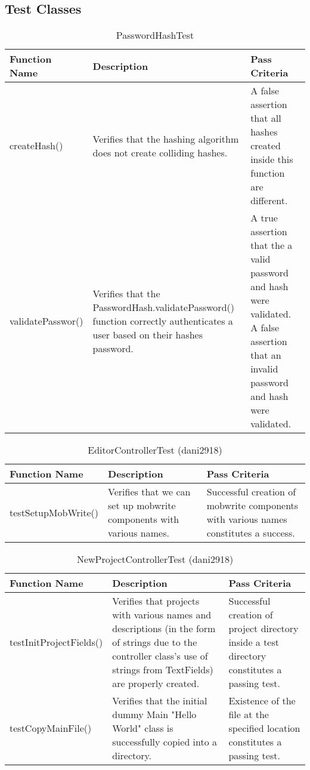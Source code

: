 \documentclass[14pt, a4paper]{article}
\begin{document}
\subsection{Test Classes}

\begin{table}[h]
	\centering	
	\caption{PasswordHashTest}
	\begin{tabular}{|p{3cm}|p{6cm}|p{6cm}|} 
		\hline
		\textbf{Function Name} & \textbf{Description} & \textbf{Pass Criteria}  \\\hline
		createHash() & Verifies that the hashing algorithm does not create colliding hashes. & A false assertion that all hashes created inside this function are different. \\\hline
		validatePasswor() & Verifies that the PasswordHash.validatePassword() function correctly authenticates a user based on their hashes password. & A true assertion that the a valid password and hash were validated. A false assertion that an invalid password and hash were validated.  \\\hline
	\end{tabular}
\end{table}


\begin{table}[h]
	\centering	
	\caption{EditorControllerTest (dani2918)}
	\begin{tabular}{|p{3cm}|p{6cm}|p{6cm}|} 
		\hline
		\textbf{Function Name} & \textbf{Description} & \textbf{Pass Criteria}  \\\hline
		testSetupMobWrite() & Verifies that we can set up mobwrite components with various names. & Successful creation of mobwrite components with various names constitutes a success. 
		  \\\hline
	\end{tabular}
\end{table}

\begin{table}[h]
	\centering	
	\caption{NewProjectControllerTest (dani2918)}
	\begin{tabular}{|p{3cm}|p{6cm}|p{6cm}|} 
		\hline
		\textbf{Function Name} & \textbf{Description} & \textbf{Pass Criteria}  \\\hline
		testInitProjectFields() & Verifies that projects with various names and descriptions (in the form of strings due to the controller class's use of strings from TextFields) are properly created. & Successful creation of project directory inside a test directory constitutes a passing test.
		  \\\hline
		  testCopyMainFile() & Verifies that the initial dummy Main "Hello World" class is successfully copied into a directory. & Existence of the file at the specified location constitutes a passing test.
		  \\\hline
	\end{tabular}
\end{table}
\end{document}
